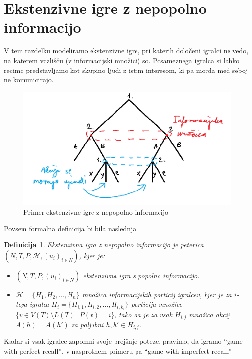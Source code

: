 \documentclass[10pt, a4paper]{article}
\newtheorem{defi}[izr]{Definicija}
\newenvironment{noticeB}{%
  \tcolorbox[%
  notitle,
  empty,
  enhanced,  %
  breakable,
  coltext=black,
  colback=white, 
  fontupper=\rmfamily,
  noparskip,
  sharp corners,
  boxrule=-1pt,  %
  frame hidden,
  left=7pt,  %
  right=7pt,
  top=5pt,
  bottom=5pt,
  before skip=2.5ex plus 2pt,
  after skip=2.5ex plus 2pt,
  borderline west = {1.5pt}{-0.1pt}{blue!30!black}, %
  overlay unbroken and last={%
    \draw[color=black, line width=1.25pt]
    ($(frame.south west)+(1.pt, -0.1pt)$) -- ++(2em, 0);
  }
  ]}
{\endtcolorbox}
\newenvironment{definicija}{\begin{noticeB}\begin{defi}}{%
    \end{defi}\end{noticeB}}
\begin{document}
\section{Ekstenzivne igre z nepopolno informacijo}

V tem razdelku modeliramo ekstenzivne igre, pri katerih
določeni igralci ne vedo, na katerem vozlišču (v informacijski množici) so.
Posameznega igralca si lahko recimo predstavljamo kot 
skupino ljudi z istim interesom, ki pa morda med seboj ne komunicirajo.
\begin{figure}[hbt!]
  \centering
  \includegraphics[scale=0.7]{drevo_8.png}
  \caption{Primer ekstenzivne igre z nepopolno informacijo}
\end{figure}
Povsem formalna definicija bi bila naslednja.

\begin{definicija}
  Ekstenzivna igra z nepopolno informacijo je peterica $(N, T, P, \mathcal{H}, (u_i)_{i \in N})$, kjer je:
  \begin{itemize}
    \item $(N, T, P, (u_i)_{i \in N})$ ekstenzivna igra s popolno informacijo.
    \item $\mathcal{H} = \{H_1, H_2, \dots, H_n\}$ množica informacijskih particij igralcev,
    kjer je za $i$-tega igralca $H_i = \{H_{i, 1}, H_{i, 2}, \dots, H_{i, k_i}\}$ particija množice $\{v \in V(T)\setminus L(T)\ |\ P(v) = i\}$,
    tako da je za vsak $H_{i, j}$ množica akcij $A(h) = A(h')$ za poljubni $h, h' \in H_{i, j}$.
  \end{itemize}
\end{definicija}

Kadar si vsak igralec zapomni svoje prejšnje poteze, pravimo, da igramo "`game with perfect recall"',
v nasprotnem primeru pa "`game with imperfect recall."'
\end{document}
